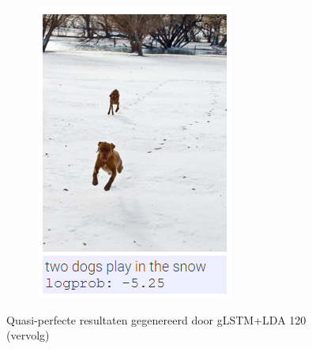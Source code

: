 \begin{figure}
\begin{subfigure}{.5\textwidth}
				\includegraphics[width=.8\linewidth]{Images/Results/Perfect/two_dogs_in_snow}
				\label{fig:perfectresults8}
			\end{subfigure}	
			\caption{Quasi-perfecte resultaten gegenereerd door gLSTM+LDA 120 (vervolg)}
			\label{fig:perfectresults_2}
		\end{figure}



